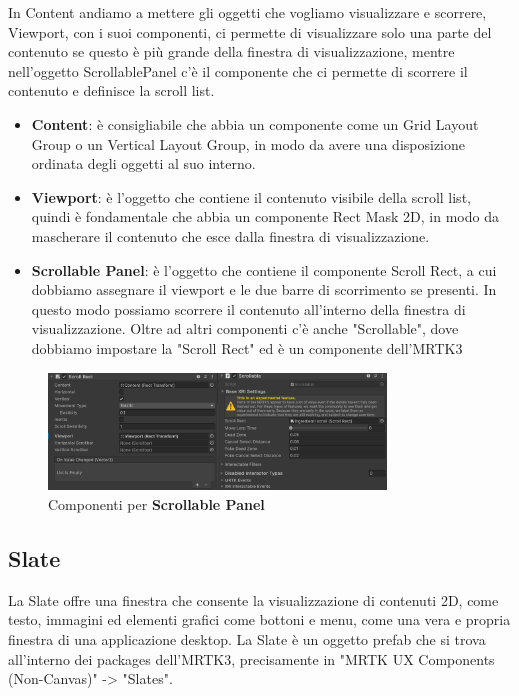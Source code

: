 In Content andiamo a mettere gli oggetti che vogliamo visualizzare e scorrere, Viewport, con i suoi componenti, ci permette di visualizzare solo una parte del contenuto se questo è più grande della finestra di visualizzazione, mentre nell'oggetto ScrollablePanel c'è il componente che ci permette di scorrere il contenuto e definisce la scroll list. 
\begin{itemize}
    \item \textbf{Content}: è consigliabile che abbia un componente come un Grid Layout Group o un Vertical Layout Group, in modo da avere una disposizione ordinata degli oggetti al suo interno.
    \item \textbf{Viewport}: è l'oggetto che contiene il contenuto visibile della scroll list, quindi è fondamentale che abbia un componente Rect Mask 2D, in modo da mascherare il contenuto che esce dalla finestra di visualizzazione.
    \item \textbf{Scrollable Panel}: è l'oggetto che contiene il componente Scroll Rect, a cui dobbiamo assegnare il viewport e le due barre di scorrimento se presenti. In questo modo possiamo scorrere il contenuto all'interno della finestra di visualizzazione. Oltre ad altri componenti c'è anche "Scrollable", dove dobbiamo impostare la "Scroll Rect" ed è un componente dell'MRTK3
\end{itemize}

\begin{figure}[H]
    \centering
    \includegraphics[width=0.8\textwidth,height=\textheight,keepaspectratio]{figures/chapter_1/ComponentiScrollBar.png}
    \caption{Componenti per \textbf{Scrollable Panel}}
\end{figure}

\subsection{Slate}
La Slate offre una finestra che consente la visualizzazione di contenuti 2D, come testo, immagini ed elementi grafici come bottoni e menu, come una vera e propria finestra di una applicazione desktop. La Slate è un oggetto prefab che si trova all'interno dei packages dell'MRTK3, precisamente in "MRTK UX Components (Non-Canvas)" -> "Slates".

